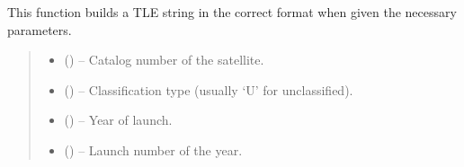 \documentclass[letterpaper,10pt,english]{sphinxmanual}
\begin{document}
\begin{fulllineitems}
\label{\detokenize{fspsim.utils:fspsim.utils.Conversions.write_tle}}
\pysigstartsignatures
{}
\pysigstopsignatures
\sphinxAtStartPar
This function builds a TLE string in the correct format when given the necessary parameters.
\begin{quote}\begin{description}
\begin{itemize}
\item {} 
\sphinxAtStartPar
{} () – Catalog number of the satellite.

\item {} 
\sphinxAtStartPar
{} () – Classification type (usually ‘U’ for unclassified).

\item {} 
\sphinxAtStartPar
{} () – Year of launch.

\item {} 
\sphinxAtStartPar
{} () – Launch number of the year.


\end{itemize}
\end{description}
\end{quote}
\end{fulllineitems}
\end{document}
